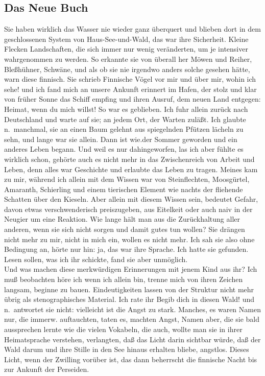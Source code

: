 \documentclass[
]{article}
\author{}
\date{\vspace{-2.5em}}
\begin{document}
\subsection{Das Neue Buch}\label{das-neue-buch}

Sie haben wirklich das Wasser nie wieder ganz überquert und blieben dort
in dem geschlossenen System von Haus-See-und-Wald, das war ihre
Sicherheit. Kleine Flecken Landschaften, die sich immer nur wenig
veränderten, um je intensiver wahrgenommen zu werden. So erkannte sie
von überall her Möwen und Reiher, Bleßhühner, Schwäne, und als ob sie
nie irgendwo anders solche gesehen hätte, warn diese finnisch. Sie
schrieb Finnische Vögel vor mir und über mir, wohin ich sehe! und ich
fand mich an unsere Ankunft erinnert im Hafen, der stolz und klar von
früher Sonne das Schiff empfing und ihren Ausruf, dem neuen Land
entgegen: Heimat, wenn du mich willst! So war es geblieben. Ich fuhr
allein zurück nach Deutschland und warte auf sie; an jedem Ort, der
Warten zuläßt. Ich glaubte n.~manchmal, sie an einen Baum gelehnt aus
spiegelnden Pfützen lächeln zu sehn, und lange war sie allein. Dann ist
wie.der Sommer geworden und ein anderes Leben begann. Und weil es nur
dahingeworfen, las ich aber fühlte es wirklich schon, gehörte auch es
nicht mehr in das Zwischenreich von Arbeit und Leben, denn alles war
Geschichte und erlaubte das Leben zu tragen. Meines kam zu mir, während
ich allein mit dem Wissen war von Steinflechten, Moosgürtel, Amaranth,
Schierling und einem tierischen Element wie nachts der fliehende
Schatten über den Kieseln. Aber allein mit diesem Wissen sein, bedeutet
Gefahr, davon etwas verschwenderisch preiszugeben, aus Eitelkeit oder
auch naiv in der Neugier um eine Reaktion. Wie lange hält man aus die
Zurückhaltung aller anderen, wenn sie sich nicht sorgen und damit gutes
tun wollen? Sie drängen nicht mehr zu mir, nicht in mich ein, wollen es
nicht mehr. Ich sah sie also ohne Bedingung an, hörte nur hin: ja, das
war ihre Sprache. Ich hatte sie gefunden. Lesen sollen, was ich ihr
schickte, fand sie aber unmöglich.\\
Und was machen diese merkwürdigen Erinnerungen mit jenem Kind aus ihr?
Ich muß beobachten höre ich wenn ich allein bin, trenne mich von ihren
Zeichen langsam, beginne zu bauen. Eindeutigkeiten lassen von der
Struktur nicht mehr übrig als stenographisches Material. Ich rate ihr
Begib dich in diesen Wald! und n.~antwortet sie nicht: vielleicht ist
die Angst zu stark. Manches, es waren Namen nur, die immerw.
auftauchten, taten es, machten Angst, Namen aber, die sie bald
aussprechen lernte wie die vielen Vokabeln, die auch, wollte man sie in
ihrer Heimatsprache verstehen, verlangten, daß das Licht darin sichtbar
würde, daß der Wald darum und ihre Stille in den See hinaus erhalten
bliebe, angstlos. Dieses Licht, wenn der Zwilling vorüber ist, das dann
beherrscht die finnische Nacht bis zur Ankunft der Perseiden.
\end{document}
